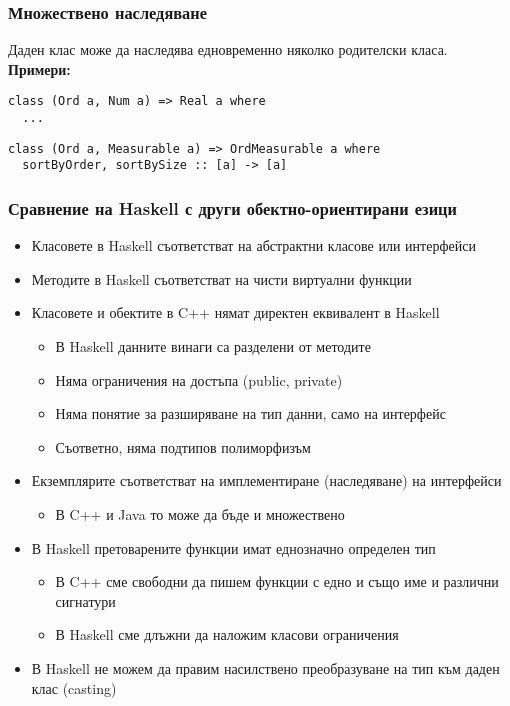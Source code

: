 \documentclass[alsotrans]{beamerswitch}
\begin{document}
\begin{frame}[fragile]
  \frametitle{Множествено наследяване}
  Даден клас може да наследява едновременно няколко родителски класа.\\[2ex]
  \textbf{Примери:}
\begin{lstlisting}
class (Ord a, Num a) => Real a where
  ...
\end{lstlisting}
\pause
\begin{lstlisting}
class (Ord a, Measurable a) => OrdMeasurable a where
  sortByOrder, sortBySize :: [a] -> [a]
\end{lstlisting}
\end{frame}

\begin{frame}
  \frametitle{Сравнение на Haskell с други обектно-ориентирани езици}
  \begin{itemize}[<+->]
  \item Класовете в Haskell съответстват на \alert{абстрактни класове или интерфейси}
  \item Методите в Haskell съответстват на \alert{чисти виртуални функции}
  \item Класовете и обектите в C++ \alert{нямат директен еквивалент в Haskell}
    \begin{itemize}
    \item В Haskell данните винаги са разделени от методите
    \item Няма ограничения на достъпа (public, private)
    \item Няма понятие за разширяване на тип данни, само на интерфейс
    \item Съответно, няма \alert{подтипов полиморфизъм}
    \end{itemize}
  \item Екземплярите съответстват на \alert{имплементиране (наследяване) на интерфейси}
    \begin{itemize}
    \item В C++ и Java то може да бъде и множествено
    \end{itemize}
  \item В Haskell претоварените функции имат \alert{еднозначно определен тип}
    \begin{itemize}
    \item В C++ сме свободни да пишем функции с едно и също име и различни сигнатури
    \item В Haskell сме длъжни да наложим класови ограничения
    \end{itemize}
  \item В Haskell не можем да правим насилствено преобразуване на тип към даден клас (casting)
  \end{itemize}
\end{frame}
\end{document}
